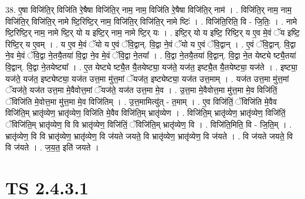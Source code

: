 \documentclass[17pt]{extarticle}
\begin{document}
38. ए॒षा विजि॑ति॒र् विजि॑ति रे॒षैषा विजि॑ति॒र् नाम॒ नाम॒ विजि॑ति रे॒षैषा विजि॑ति॒र् नाम॑ । . विजि॑ति॒र् नाम॒ नाम॒ विजि॑ति॒र् विजि॑ति॒र् नामे ष्टि॒रिष्टि॒र् नाम॒ विजि॑ति॒र् विजि॑ति॒र् नामे ष्टिः॑ । . विजि॑ति॒रिति॒ वि - जि॒तिः॒ । . नामे ष्टि॒रिष्टि॒र् नाम॒ नामे ष्टि॒र् यो य इष्टि॒र् नाम॒ नामे ष्टि॒र् यः । . इष्टि॒र् यो य इष्टि॒ रिष्टि॒र् य ए॒व मे॒वं ॅय इष्टि॒ रिष्टि॒र् य ए॒वम् । . य ए॒व मे॒वं ॅयो य ए॒वं ॅवि॒द्वान्. वि॒द्वा ने॒वं ॅयो य ए॒वं ॅवि॒द्वान् । . ए॒वं ॅवि॒द्वान्. वि॒द्वा ने॒व मे॒वं ॅवि॒द्वा ने॒तयै॒तया॑ वि॒द्वा ने॒व मे॒वं ॅवि॒द्वा ने॒तया᳚ । . वि॒द्वा ने॒तयै॒तया॑ वि॒द्वान्. वि॒द्वा ने॒त येष्ट्ये ष्ट्यै॒तया॑ वि॒द्वान्. वि॒द्वा ने॒तयेष्ट्या᳚ । . ए॒त येष्ट्ये ष्ट्यै॒त यै॒तयेष्ट्या॒ यज॑ते॒ यज॑त॒ इष्ट्यै॒त यै॒तयेष्ट्या॒ यज॑ते । . इष्ट्या॒ यज॑ते॒ यज॑त॒ इष्ट्येष्ट्या॒ यज॑त उत्त॒मा मु॑त्त॒मां ॅयज॑त॒ इष्ट्येष्ट्या॒ यज॑त उत्त॒माम् । . यज॑त उत्त॒मा मु॑त्त॒मां ॅयज॑ते॒ यज॑त उत्त॒मा मे॒वैवोत्त॒मां ॅयज॑ते॒ यज॑त उत्त॒मा मे॒व । . उ॒त्त॒मा मे॒वैवोत्त॒मा मु॑त्त॒मा मे॒व विजि॑तिं॒ ॅविजि॑ति मे॒वोत्त॒मा मु॑त्त॒मा मे॒व विजि॑तिम् । . उ॒त्त॒मामित्यु॑त् - त॒माम् । . ए॒व विजि॑तिं॒ ॅविजि॑ति मे॒वैव विजि॑ति॒म् भ्रातृ॑व्येण॒ भ्रातृ॑व्येण॒ विजि॑ति मे॒वैव विजि॑ति॒म् भ्रातृ॑व्येण । . विजि॑ति॒म् भ्रातृ॑व्येण॒ भ्रातृ॑व्येण॒ विजि॑तिं॒ ॅविजि॑ति॒म् भ्रातृ॑व्येण॒ वि वि भ्रातृ॑व्येण॒ विजि॑तिं॒ ॅविजि॑ति॒म् भ्रातृ॑व्येण॒ वि । . विजि॑ति॒मिति॒ वि - जि॒ति॒म् । . भ्रातृ॑व्येण॒ वि वि भ्रातृ॑व्येण॒ भ्रातृ॑व्येण॒ वि ज॑यते जयते॒ वि भ्रातृ॑व्येण॒ भ्रातृ॑व्येण॒ वि ज॑यते । . वि ज॑यते जयते॒ वि वि ज॑यते । . ज॒य॒त॒ इति॑ जयते । \newline
\pagebreak
{}

\section{ TS 2.4.3.1 }
\end{document}
